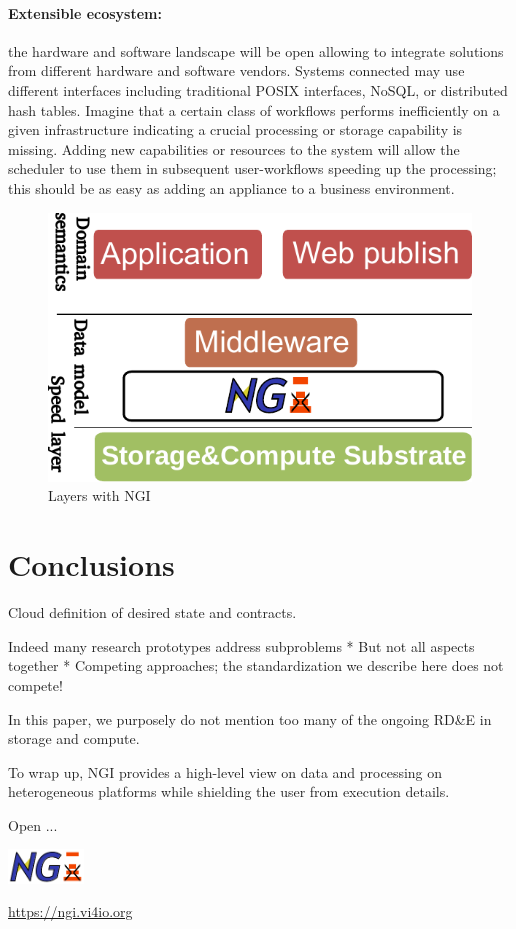\documentclass[a4paper, twocolumn]{article}
\begin{document}
\paragraph{Extensible ecosystem:}
the hardware and software landscape will be open allowing to integrate solutions from different hardware and software vendors.
Systems connected may use different interfaces including traditional POSIX interfaces, NoSQL, or distributed hash tables.
Imagine that a certain class of workflows performs inefficiently on a given infrastructure indicating a crucial processing or storage capability is missing.
Adding new capabilities or resources to the system will allow the scheduler to use them in subsequent user-workflows speeding up the processing; this should be as easy as adding an appliance to a business environment.



\begin{figure}[b]
  \centering
  \includegraphics[width=0.75\columnwidth]{layers-ngi}
  \caption{Layers with NGI}
  \label{fig:ngilayers}
\end{figure}



\section{Conclusions}
\label{sec:conclusions}


Cloud definition of desired state and contracts.

Indeed many research prototypes address subproblems
* But not all aspects together
* Competing approaches; the standardization we describe here does not compete!

In this paper, we purposely do not mention too many of the ongoing RD\&E in storage and compute.




To wrap up, NGI provides a high-level view on data and processing on heterogeneous platforms while shielding the user from execution details.

Open ...

\includegraphics[width=2cm]{ngi-logo}

\noindent\url{https://ngi.vi4io.org}
\end{document}
